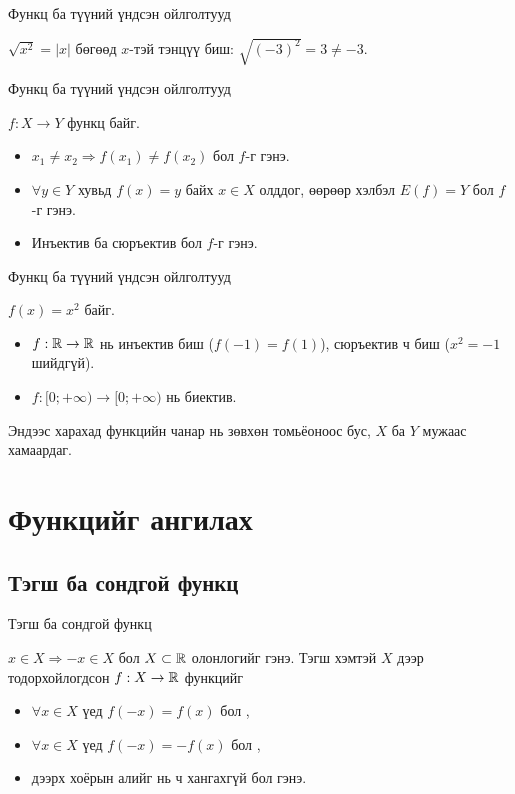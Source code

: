 \begin{frame}[allowframebreaks]{Функц ба түүний үндсэн ойлголтууд}
\begin{remark}
$\sqrt{x^2}=|x|$ бөгөөд $x$-тэй тэнцүү биш: $\sqrt{(-3)^2}=3\neq-3$.
\end{remark}
\end{frame}

\begin{frame}[allowframebreaks]{Функц ба түүний үндсэн ойлголтууд}
\begin{definition}
$f:X\to Y$ функц байг.
\begin{itemize}
  \item $x_1\neq x_2 \Rightarrow f(x_1)\neq f(x_2)$ бол $f$-г  гэнэ.
  \item $\forall y\in Y$ хувьд $f(x)=y$ байх $x\in X$ олддог, өөрөөр хэлбэл $E(f)=Y$ бол
        $f$-г  гэнэ.
  \item Инъектив ба сюръектив бол $f$-г  гэнэ.
\end{itemize}
\end{definition}
\end{frame}

\begin{frame}[allowframebreaks]{Функц ба түүний үндсэн ойлголтууд}
\begin{example}
$f(x)=x^2$ байг.
\begin{itemize}
  \item $f:\mathbb{R}\to\mathbb{R}$ нь инъектив биш ($f(-1)=f(1)$), сюръектив ч биш ($x^2=-1$ шийдгүй).
  \item $f:[0;+\infty)\to[0;+\infty)$ нь биектив.
\end{itemize}
Эндээс харахад функцийн чанар нь зөвхөн томьёоноос бус, $X$ ба $Y$ мужаас хамаардаг.
\end{example}
\end{frame}

\section{Функцийг ангилах}
\subsection{Тэгш ба сондгой функц}
\begin{frame}[allowframebreaks]{Тэгш ба сондгой функц}
\begin{definition}
$x\in X \Rightarrow -x\in X$ бол $X\subset\mathbb{R}$ олонлогийг  гэнэ.
Тэгш хэмтэй $X$ дээр тодорхойлогдсон $f:X\to\mathbb{R}$ функцийг
\begin{itemize}
  \item $\forall x\in X$ үед $f(-x)=f(x)$ бол ,
  \item $\forall x\in X$ үед $f(-x)=-f(x)$ бол ,
  \item дээрх хоёрын алийг нь ч хангахгүй бол  гэнэ.
\end{itemize}
\end{definition}
\end{frame}

